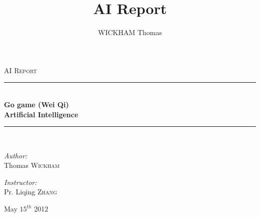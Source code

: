 \documentclass[12pt,a4paper,titlepage]{book}
\author{WICKHAM Thomas}
\title{AI Report}
\newcommand{\HRule}{\rule{\linewidth}{0.5mm}}
\begin{document}
\begin{titlepage}

\begin{center}
\textsc{\LARGE AI Report}\\[0.5cm]


\HRule \\[1.0cm]
{\Huge \bfseries Go game (Wei Qi)\\[2ex]
Artificial Intelligence}\\[1.0cm]

\HRule \\[2.0cm]

\begin{minipage}{0.4\textwidth}
\begin{flushleft} \large
\emph{Author:}\\
Thomas \textsc{Wickham}
\end{flushleft}
\end{minipage}
\begin{minipage}{0.4\textwidth}
\begin{flushright} \large
\emph{Instructor:} \\
Pr. Liqing \textsc{Zhang}
\end{flushright}
\end{minipage}

\vfill

{\large May $15^{th}$ 2012}

\end{center}

\end{titlepage}

\newpage
\end{document}
